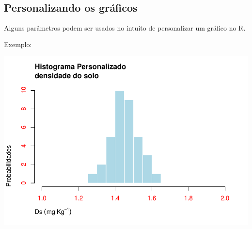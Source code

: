 \documentclass[
]{book}
\newenvironment{Shaded}{\begin{snugshade}}{\end{snugshade}}
\newcommand{\KeywordTok}[1]{\textcolor[rgb]{0.13,0.29,0.53}{\textbf{#1}}}
\newcommand{\NormalTok}[1]{#1}
\newcommand{\OperatorTok}[1]{\textcolor[rgb]{0.81,0.36,0.00}{\textbf{#1}}}
\begin{document}
\hypertarget{personalizando-os-gruxe1ficos}{%
\subsection{Personalizando os gráficos}\label{personalizando-os-gruxe1ficos}}

Alguns parâmetros podem ser usados no intuito de personalizar um gráfico no R.

Exemplo:

\begin{Shaded}
\end{Shaded}

\includegraphics{TudodoR_files/figure-latex/unnamed-chunk-168-1.pdf}
\end{document}
